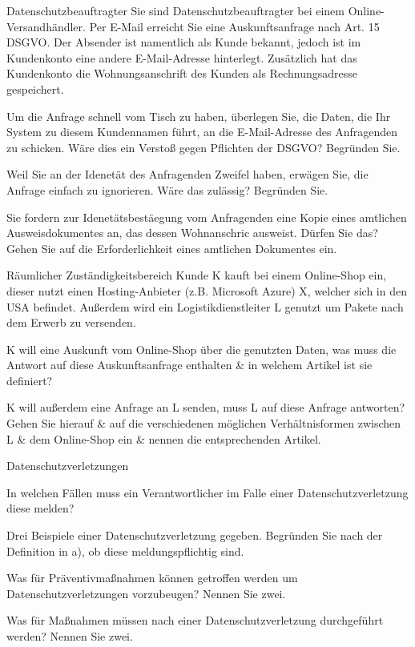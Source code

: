 \documentclass{exercisesheet}
\begin{document}
{\begin{exercise*}{Datenschutzbeauftragter}{
    Sie sind Datenschutzbeauftragter bei einem Online-Versandhändler. Per E-Mail erreicht Sie eine Auskunftsanfrage nach Art. 15 DSGVO. Der Absender ist namentlich als Kunde bekannt, jedoch ist im Kundenkonto eine andere E-Mail-Adresse hinterlegt. Zusätzlich hat das Kundenkonto die Wohnungsanschrift des Kunden als Rechnungsadresse gespeichert.
  }
  \item Um die Anfrage schnell vom Tisch zu haben, überlegen Sie, die Daten, die Ihr System zu diesem Kundennamen führt, an die E-Mail-Adresse des Anfragenden zu schicken. Wäre dies ein Verstoß gegen Pflichten der DSGVO? Begründen Sie.
  \item Weil Sie an der Idenetät des Anfragenden Zweifel haben, erwägen Sie, die Anfrage einfach zu ignorieren. Wäre das zulässig? Begründen Sie.
  \item Sie fordern zur Idenetätsbestäegung vom Anfragenden eine Kopie eines amtlichen Ausweisdokumentes an, das dessen Wohnanschric ausweist. Dürfen Sie das? Gehen Sie auf die Erforderlichkeit eines amtlichen Dokumentes ein.
\end{exercise*}


\begin{exercise*}{Räumlicher Zuständigkeitsbereich}{
    Kunde K kauft bei einem Online-Shop ein, dieser nutzt einen Hosting-Anbieter (z.B. Microsoft Azure) X, welcher sich in den USA befindet. Außerdem wird ein Logistikdienstleiter L genutzt um Pakete nach dem Erwerb zu versenden.
  }
  \item K will eine Auskunft vom Online-Shop über die genutzten Daten, was muss die Antwort auf diese Auskunftsanfrage enthalten \& in welchem Artikel ist sie definiert?
  \item K will außerdem eine Anfrage an L senden, muss L auf diese Anfrage antworten? Gehen Sie hierauf \& auf die verschiedenen möglichen Verhältnisformen zwischen L \& dem Online-Shop ein \& nennen die entsprechenden Artikel.
\end{exercise*}

\begin{exercise**}{Datenschutzverletzungen}
  \item In welchen Fällen muss ein Verantwortlicher im Falle einer Datenschutzverletzung diese melden?
  \item Drei Beispiele einer Datenschutzverletzung gegeben. Begründen Sie nach der Definition in a), ob diese meldungspflichtig sind.
  \item Was für Präventivmaßnahmen können getroffen werden um Datenschutzverletzungen vorzubeugen? Nennen Sie zwei.
  \item Was für Maßnahmen müssen nach einer Datenschutzverletzung durchgeführt werden? Nennen Sie zwei.
\end{exercise**}

}
\end{document}
